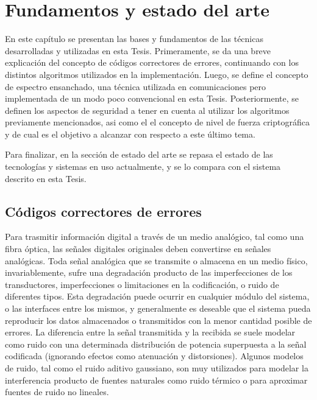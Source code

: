 \chapter{Fundamentos y estado del arte}

En este capítulo se presentan las bases y fundamentos de las técnicas desarrolladas y utilizadas en esta Tesis. 
Primeramente, se da una breve explicación del concepto de códigos correctores de errores, continuando con los distintos algoritmos utilizados en la implementación. Luego, se define el concepto de espectro ensanchado, una técnica utilizada en comunicaciones pero implementada de un modo poco convencional en esta Tesis. Posteriormente, se definen los aspectos de seguridad a tener en cuenta al utilizar los algoritmos previamente mencionados, asi como el el concepto de nivel de fuerza criptográfica y de cual es el objetivo a alcanzar con respecto a este último tema.

Para finalizar, en la sección de estado del arte se repasa el estado de las tecnologías y sistemas en uso actualmente, y se lo compara con el sistema descrito en esta Tesis.

\section{Códigos correctores de errores}
\label{cap2:ECC}
Para trasmitir información digital a través de un medio analógico, tal como una fibra óptica, las señales digitales originales deben convertirse en señales analógicas.
Toda señal analógica que se transmite o almacena en un medio físico, invariablemente, sufre una degradación producto de las imperfecciones de los transductores, imperfecciones o limitaciones en la codificación, o ruido de diferentes tipos. Esta degradación puede ocurrir en cualquier módulo del sistema, o las interfaces entre los mismos, y generalmente es deseable que el sistema pueda reproducir los datos almacenados o transmitidos con la menor cantidad posible de errores. La diferencia entre la señal transmitida y la recibida se suele modelar como ruido con una determinada distribución de potencia superpuesta a la señal codificada (ignorando efectos como atenuación y distorsiones). Algunos modelos de ruido, tal como el ruido aditivo gaussiano, son muy utilizados para modelar la interferencia producto de fuentes naturales como ruido térmico o para aproximar fuentes de ruido no lineales.

